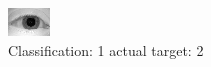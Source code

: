 \begin{figure}[h!]
\begin{center}
\includegraphics[width=0.60\columnwidth]{figures/ID954_class_1_target_2.png}
\end{center}
\caption{ Classification: 1 actual target: 2}
\label{fig:ID954_class_1_target_2}
\end{figure}
